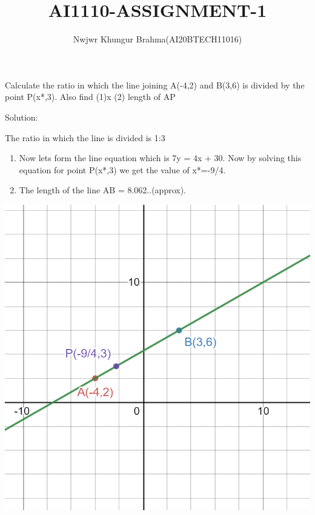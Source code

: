 \documentclass{article}
\begin{document}
\title{AI1110-ASSIGNMENT-1}
\author{Nwjwr Khungur Brahma(AI20BTECH11016)}



\maketitle

Calculate the ratio in which the line joining A(-4,2) and B(3,6) is divided by the point P(x*,3). Also find (1)x  (2) length of AP

Solution:

The ratio in which the line is divided is 1:3
\begin{enumerate}
\item Now lets form the line equation which is 7y = 4x + 30.
Now by solving this equation for point P(x*,3) we get the value of x*=-9/4.
\item The length of the line AB = 8.062..(approx).
\end{enumerate}
\includegraphics[scale=0.3]{fig.png}
\end{document}
